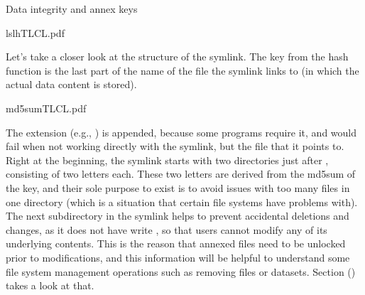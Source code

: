 \begin{findoutmore}[label={fom-objecttree}, before title={\thetcbcounter\ }, float, floatplacement=tbp, check odd page=true]{Data integrity and annex keys}
\begin{sphinxVerbatim}[commandchars=\\\{\}]
ls\PYGZhy{}lhTLCL.pdf
\end{sphinxVerbatim}

\sphinxAtStartPar
Let’s take a closer look at the structure of the symlink.
The key from the hash function is the last part of the name of the file the symlink links to (in which the actual data content is stored).

\ignorespaces 
\def\sphinxLiteralBlockLabel{\label{\detokenize{basics/101-115-symlinks:index-4}}}
\begin{sphinxVerbatim}[commandchars=\\\{\}]
md5sumTLCL.pdf
\end{sphinxVerbatim}

\sphinxAtStartPar
The extension (e.g., ) is appended, because some programs require it, and would fail when not working directly with the symlink, but the file that it points to.
Right at the beginning, the symlink starts with two directories just after ,
consisting of two letters each.
These two letters are derived from the md5sum of the key, and their sole purpose to exist is to avoid issues with too many files in one directory (which is a situation that certain file systems have problems with).
The next subdirectory in the symlink helps to prevent accidental deletions and changes, as it does not have write {\hyperref[\detokenize{glossary:term-permissions}]{}}, so that users cannot modify any of its underlying contents.
This is the reason that annexed files need to be unlocked prior to modifications, and this information will be helpful to understand some file system management operations such as removing files or datasets. Section {\hyperref[\detokenize{basics/101-136-filesystem:file-system}]{}} () takes a look at that.


\end{findoutmore}
